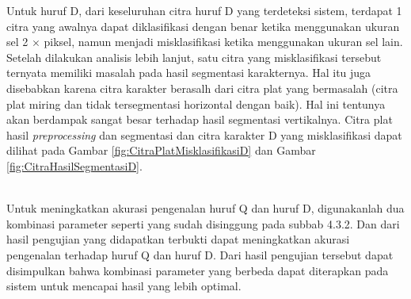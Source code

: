 \noindent Untuk huruf D, dari keseluruhan citra huruf D yang terdeteksi sistem, terdapat 1 citra yang awalnya dapat diklasifikasi dengan benar ketika menggunakan ukuran sel 2 $\times$ piksel, namun menjadi misklasifikasi ketika menggunakan ukuran sel lain. Setelah dilakukan analisis lebih lanjut, satu citra yang misklasifikasi tersebut ternyata memiliki masalah pada hasil segmentasi karakternya. Hal itu juga disebabkan karena citra karakter berasalh dari citra plat yang bermasalah (citra plat miring dan tidak tersegmentasi horizontal dengan baik). Hal ini tentunya akan berdampak sangat besar terhadap hasil segmentasi vertikalnya. Citra plat hasil \textit{preprocessing} dan segmentasi dan citra karakter D yang misklasifikasi dapat dilihat pada Gambar \ref{fig:CitraPlatMisklasifikasiD} dan Gambar \ref{fig:CitraHasilSegmentasiD}.

\begin{adjustbox}{width=1\textwidth}
	\noindent\begin{minipage}{\linewidth}
		\centering{}
		\label{fig:CitraPlatMisklasifikasiD}
	\end{minipage}
\end{adjustbox}

\begin{adjustbox}{width=1\textwidth}
	\noindent\begin{minipage}{\linewidth}
		\centering{}
		\label{fig:CitraHasilSegmentasiD}
	\end{minipage}
\end{adjustbox}\\

\noindent Untuk meningkatkan akurasi pengenalan huruf Q dan huruf D, digunakanlah dua kombinasi parameter seperti yang sudah disinggung pada subbab 4.3.2. Dan dari hasil pengujian yang didapatkan terbukti dapat meningkatkan akurasi pengenalan terhadap huruf Q dan huruf D. Dari hasil pengujian tersebut dapat disimpulkan bahwa kombinasi parameter yang berbeda dapat diterapkan pada sistem untuk mencapai hasil yang lebih optimal.\\

